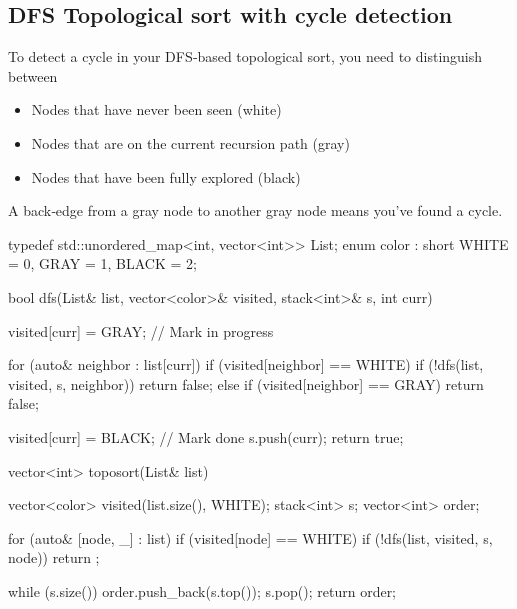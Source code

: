 \documentclass{report}
\begin{document}
\pagebreak \bigbreak \noindent 
\subsection{DFS Topological sort with cycle detection}
\bigbreak \noindent 
To detect a cycle in your DFS‐based topological sort, you need to distinguish between
\begin{itemize}
    \item Nodes that have never been seen (white)
    \item Nodes that are on the current recursion path (gray)
    \item Nodes that have been fully explored (black)
\end{itemize}
\bigbreak \noindent 
A back‐edge from a gray node to another gray node means you’ve found a cycle.

\bigbreak \noindent 
\begin{cppcode}
typedef std::unordered_map<int, vector<int>> List;
enum color : short {WHITE = 0, GRAY = 1, BLACK = 2};

bool dfs(List& list, vector<color>& visited, stack<int>& s, int curr) {
    visited[curr] = GRAY; // Mark in progress

    for (auto& neighbor : list[curr]) {
        if (visited[neighbor] == WHITE) {
            if (!dfs(list, visited, s, neighbor)) return false;
        } else if (visited[neighbor] == GRAY) {
            return false;
        }
    }

    visited[curr] = BLACK; // Mark done
    s.push(curr);
    return true;
}

vector<int> toposort(List& list) {
    vector<color> visited(list.size(), WHITE);
    stack<int> s;
    vector<int> order;

    for (auto& [node, _] : list) {
        if (visited[node] == WHITE) {
            if (!dfs(list, visited, s, node)) return {};
        }
    }

    while (s.size()) {
        order.push_back(s.top());
        s.pop();
    }
    return order;
}
\end{cppcode}



\pagebreak \bigbreak \noindent 
\end{document}
